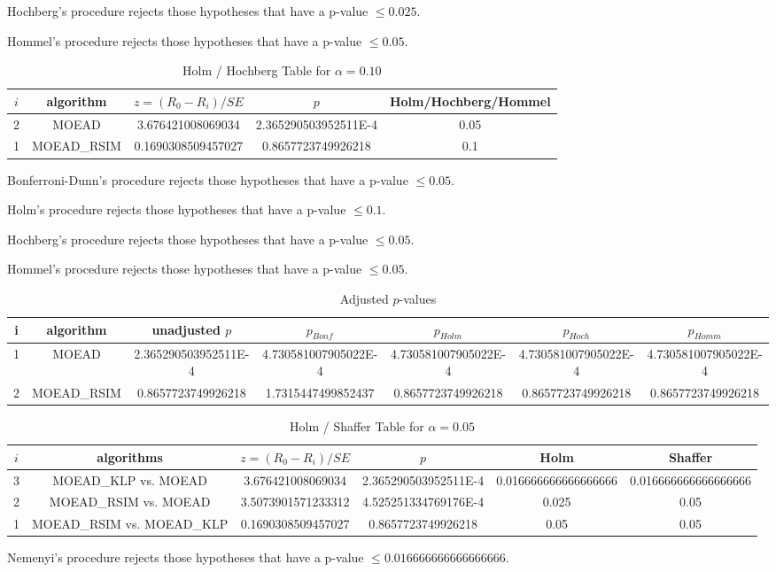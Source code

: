 \documentclass[a4paper,10pt]{article}
\begin{document}
\begin{landscape}
Hochberg's procedure rejects those hypotheses that have a p-value $\le0.025$.


Hommel's procedure rejects those hypotheses that have a p-value $\le0.05$.


\begin{table}[!htp]
\centering\tiny
\caption{Holm / Hochberg Table for $\alpha=0.10$}
\begin{tabular}{ccccc}
$i$&algorithm&$z=(R_0 - R_i)/SE$&$p$&Holm/Hochberg/Hommel\\
\hline
2&MOEAD&3.676421008069034&2.365290503952511E-4&0.05\\
1&MOEAD_RSIM&0.1690308509457027&0.8657723749926218&0.1\\
\hline
\end{tabular}
\end{table}
Bonferroni-Dunn's procedure rejects those hypotheses that have a p-value $\le0.05$.


Holm's procedure rejects those hypotheses that have a p-value $\le0.1$.


Hochberg's procedure rejects those hypotheses that have a p-value $\le0.05$.


Hommel's procedure rejects those hypotheses that have a p-value $\le0.05$.


\begin{table}[!htp]
\centering\tiny
\caption{Adjusted $p$-values}
\begin{tabular}{ccccccc}
i&algorithm&unadjusted $p$&$p_{Bonf}$&$p_{Holm}$&$p_{Hoch}$&$p_{Homm}$\\
\hline
1&MOEAD&2.365290503952511E-4&4.730581007905022E-4&4.730581007905022E-4&4.730581007905022E-4&4.730581007905022E-4\\
2&MOEAD_RSIM&0.8657723749926218&1.7315447499852437&0.8657723749926218&0.8657723749926218&0.8657723749926218\\
\hline
\end{tabular}
\end{table}

\begin{table}[!htp]
\centering\tiny
\caption{Holm / Shaffer Table for $\alpha=0.05$}
\begin{tabular}{cccccc}
$i$&algorithms&$z=(R_0 - R_i)/SE$&$p$&Holm&Shaffer\\
\hline
3&MOEAD_KLP vs. MOEAD&3.676421008069034&2.365290503952511E-4&0.016666666666666666&0.016666666666666666\\
2&MOEAD_RSIM vs. MOEAD&3.5073901571233312&4.525251334769176E-4&0.025&0.05\\
1&MOEAD_RSIM vs. MOEAD_KLP&0.1690308509457027&0.8657723749926218&0.05&0.05\\
\hline
\end{tabular}
\end{table}
Nemenyi's procedure rejects those hypotheses that have a p-value $\le0.016666666666666666$.



\end{landscape}
\end{document}
